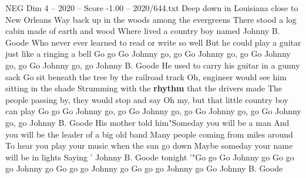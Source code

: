\begin{textsample}{NEG Dim 4 – 2020 – Score -1.00 – 2020/644.txt}  \label{ex:f4_neg_025}
Deep down in Louisiana close to New Orleans Way back up in the woods among the evergreens There stood a log cabin made of earth and wood Where lived a country boy named Johnny B.
Goode Who never ever learned to read or write so well But he could play a guitar just like a ringing a bell Go go Go Johnny go, go Go Johnny go, go Go Johnny go, go Go Johnny go, go Johnny B.
Goode He used to carry his guitar in a gunny sack Go sit beneath the tree by the railroad track Oh, engineer would see him sitting in the shade Strumming with the \textbf{rhythm} that the drivers made The people passing by, they would stop and say Oh my, but that little country boy can play Go go Go Johnny go, go Go Johnny go, go Go Johnny go, go Go Johnny go, go Johnny B.
Goode His mother told him"Someday you will be a man And you will be the leader of a big old band Many people coming from miles around To hear you play your music when the sun go down Maybe someday your name will be in lights Saying ' Johnny B.
Goode tonight '"Go go Go Johnny go Go go go Johnny go Go go go Johnny go Go go go Johnny go Go Johnny B.
Goode

\end{textsample}
